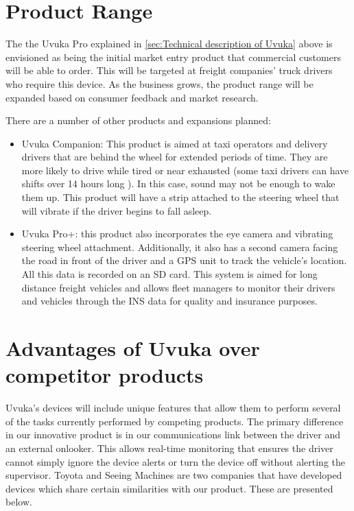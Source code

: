 \section{Product Range}
The the Uvuka Pro explained in \cref{sec:Technical description of Uvuka} above is envisioned as being the initial market entry product that commercial customers will be able to order. This will be targeted at freight companies' truck drivers who require this device. As the business grows, the product range will be expanded based on consumer feedback and market research.

There are a number of other products and expansions planned:
\begin{itemize}
\item Uvuka Companion: This product is aimed at taxi operators and delivery drivers that are behind the wheel for extended periods of time. They are more likely to drive while tired or near exhausted (some taxi drivers can have shifts over 14 hours long \cite{taxiDriverHours}). In this case, sound may not be enough to wake them up. This product will have a strip attached to the steering wheel that will vibrate if the driver begins to fall asleep.
\item Uvuka Pro+: this product also incorporates the eye camera and vibrating steering wheel attachment. Additionally, it also has a second camera facing the road in front of the driver and a GPS unit to track the vehicle's location. All this data is recorded on an SD card. This system is aimed for long distance freight vehicles and allows fleet managers to monitor their drivers and vehicles through the INS data for quality and insurance purposes.
\end{itemize}

\section{Advantages of Uvuka over competitor products}
\label{sec:advantages}
Uvuka's devices will include unique features that allow them to perform several of the tasks currently performed by competing products. The primary difference in our innovative product is in our communications link between the driver and an external onlooker. This allows real-time monitoring that ensures the driver cannot simply ignore the device alerts or turn the device off without alerting the supervisor. Toyota and Seeing Machines are two companies that have developed devices which share certain similarities with our product. These are presented below.

